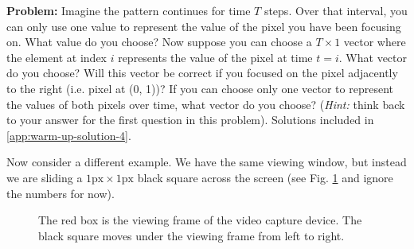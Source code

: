 \textbf{Problem:} Imagine the pattern continues for time $T$ steps. Over that interval, you can only use one value to represent the value of the pixel you have been focusing on. What value do you choose? Now suppose you can choose a $T \times 1$ vector where the element at index $i$ represents the value of the pixel at time $t = i$. What vector do you choose? Will this vector be correct if you focused on the pixel adjacently to the right (i.e. pixel at (0, 1))? If you can choose only one vector to represent the values of both pixels over time, what vector do you choose? (\textit{Hint:} think back to your answer for the first question in this problem). Solutions included in \ref{app:warm-up-solution-4}.

Now consider a different example. We have the same viewing window, but instead we are sliding a $1\text{px} \times 1\text{px}$ black square across the screen (see Fig. \ref{fig:warm-up-4-experiment-2} and ignore the numbers for now).
\begin{figure}[ht]
	\centering
	\caption{The red box is the viewing frame of the video capture device. The black square moves under the viewing frame from left to right.}
	\label{fig:warm-up-4-experiment-2}
\end{figure}

